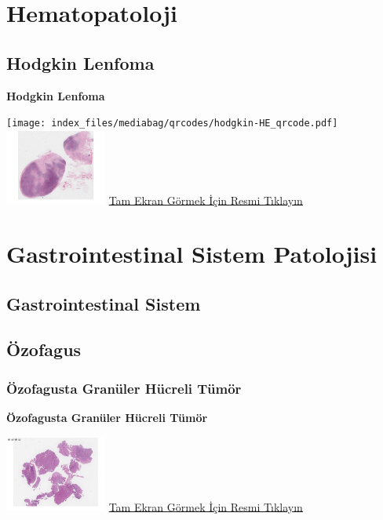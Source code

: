 \documentclass[
  letterpaper,
  DIV=11,
  numbers=noendperiod]{scrreprt}
\begin{document}
\part{Hematopatoloji}

\hypertarget{sec-hodgkin-lenfoma}{%
\chapter{Hodgkin Lenfoma}\label{sec-hodgkin-lenfoma}}

\textbf{Hodgkin Lenfoma}

\texttt{[image: index\_files/mediabag/qrcodes/hodgkin-HE\_qrcode.pdf]}
\href{https://images.patolojiatlasi.com/hodgkin/HE.html}{\includegraphics[width=0.25\textwidth,height=\textheight]{./screenshots/thumbnail_hodgkin.png}}
\href{https://images.patolojiatlasi.com/hodgkin/HE.html}{Tam Ekran
Görmek İçin Resmi Tıklayın}

\part{Gastrointestinal Sistem Patolojisi}

\hypertarget{sec-gastrointestinal-sistem}{%
\chapter{Gastrointestinal Sistem}\label{sec-gastrointestinal-sistem}}

\hypertarget{sec-ozofagus}{%
\chapter{Özofagus}\label{sec-ozofagus}}

\hypertarget{sec-ozofagus-granuler-hucreli-tumor}{%
\section{Özofagusta Granüler Hücreli
Tümör}\label{sec-ozofagus-granuler-hucreli-tumor}}

\textbf{Özofagusta Granüler Hücreli Tümör}

\href{https://images.patolojiatlasi.com/granular-cell-tumor/HE.html}{\includegraphics[width=0.25\textwidth,height=\textheight]{./screenshots/thumbnail_granular-cell-tumor.png}}
\href{https://images.patolojiatlasi.com/granular-cell-tumor/HE.html}{Tam
Ekran Görmek İçin Resmi Tıklayın}
\end{document}
